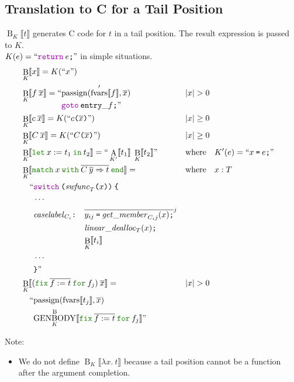 \documentclass[a4paper,fleqn]{article}
\newcommand{\kwlet}{\mbox{\color{mygreen}\ttfamily let}}
\newcommand{\kwin}{\mbox{\color{mygreen}\ttfamily in}}
\newcommand{\kwmatch}{\mbox{\color{mygreen}\ttfamily match}}
\newcommand{\kwwith}{\mbox{\color{mygreen}\ttfamily with}}
\newcommand{\kwend}{\mbox{\color{mygreen}\ttfamily end}}
\newcommand{\kwfix}{\mbox{\color{mygreen}\ttfamily fix}}
\newcommand{\kwfor}{\mbox{\color{mygreen}\ttfamily for}}
\newcommand{\lam}[2]{\lambda #1.\:#2}
\newcommand{\letin}[3]{\kwlet\:#1:=#2\:\kwin\:#3}
\newcommand{\omatch}[2]{\kwmatch\:#1\:\kwwith\:{#2}\:\kwend}
\newcommand{\ofix}[2]{\kwfix\:{#1}\:\kwfor\:{#2}}
\newcommand{\BRA}[1]{\llbracket #1 \rrbracket}
\DeclareMathOperator{\genbody}{GENBODY}
\newcommand{\genbodyb}[2]{\genbody^\mathrm{B}_{#1}\BRA{#2}}
\newcommand{\ldq}{\text{``}}
\newcommand{\rdq}{\text{''}}
\newcommand{\dq}[1]{\text{``}#1\text{''}}
\newcommand{\ttparen}[1]{\texttt{(}#1\texttt{)}}
\newcommand{\ttlbrace}{\texttt{\char '173}}
\newcommand{\ttrbrace}{\texttt{\char '175}}
\newcommand{\tteq}{\texttt{=}}
\newcommand{\ttsemi}{\texttt{;}}
\newcommand{\ttcolon}{\texttt{:}}
\newcommand{\kwswitch}{\mbox{\color{myviolet}\ttfamily switch}}
\newcommand{\kwgoto}{\mbox{\color{myviolet}\ttfamily goto}}
\newcommand{\kwCreturn}{\mbox{\color{myviolet}\ttfamily return}}
\DeclareMathOperator{\passign}{passign}
\DeclareMathOperator{\fvarsop}{fvars}
\newcommand{\fvars}[1]{\fvarsop\BRA{#1}}
\newcommand{\fvarsd}[1]{\fvarsop'\BRA{#1}}
\DeclareMathOperator{\Aop}{A}
\DeclareMathOperator{\Bop}{B}
\newcommand{\A}[2]{\Aop_{#1}\BRA{#2}}
\newcommand{\B}[2]{\Bop_{#1}\BRA{#2}}
\newcommand{\rep}[1]{\overline{#1}}
\newcommand{\repi}[2]{\overline{#1}^{#2}}
\begin{document}
\subsection{Translation to C for a Tail Position}\label{sec:BK}
$\B{K}{t}$ generates C code for $t$ in a tail position.
The result expression is passed to $K$. \\
$K(e) = \dq{\kwCreturn\:e\ttsemi}$ in simple situations.
\begin{align*}
  &\B{K}{x} = K(\dq{x}) \\
  &\B{K}{f\:\rep{x}} = \begin{aligned}[t] \ldq & {\passign(\fvarsd{f}, \rep{x})} \\ & \kwgoto\:\mathtt{entry\_}f\ttsemi \rdq \end{aligned}
    && |x| > 0 \\
  &\B{K}{c\:\rep{x}} = K(\dq{c\ttparen{\rep{x}}})                                   && |x| \geq 0 \\
  &\B{K}{C\:\rep{x}} = K(\dq{C\ttparen{\rep{x}}})                                   && |x| \geq 0 \\
  &\B{K}{\letin{x}{t_1}{t_2}} = \ldq \A{K'}{t_1}\; \B{K}{t_2} \rdq
    && \text{where}\quad K'(e) = \dq{x\:\tteq\:e\ttsemi} \\
  &\B{K}{\omatch{x}{\rep{C\:\rep{y}\Rightarrow t}}} = && \text{where}\quad x : T \\
     & \quad\begin{alignedat}{2}
       \ldq & \kwswitch\:\ttparen{\mathit{swfunc}_T\ttparen{x}}\:\ttlbrace \\
            & \cdots \\
            & \mathit{caselabel}_{C_i}\ttcolon\quad
              \begin{aligned}[t]
                & \repi{y_{ij}\:\tteq\:\mathit{get\_member}_{C_i j}(x)\ttsemi}{j} \\
                & \mathit{linear\_dealloc}_{T}(x)\ttsemi \\
                & {\B{K}{t_i}}
              \end{aligned} \\
            & \cdots \\
            & \ttrbrace\rdq
     \end{alignedat} \\
  &\B{K}{(\ofix{\rep{f:=t}}{f_j})\:\rep{x}} =       && |x| > 0 \\
     & \quad\begin{alignedat}{2}
       \ldq & {\passign(\fvars{t_j}, \rep{x})} \\
            & {\genbodyb{K}{\ofix{\rep{f:=t}}{f_j}}} \rdq
       \end{alignedat}
\end{align*}
{\small Note:
\begin{itemize}
  \item We do not define $\B{K}{\lam{x}{t}}$ because a tail position cannot be a function after the argument completion.
\end{itemize}}
\end{document}
